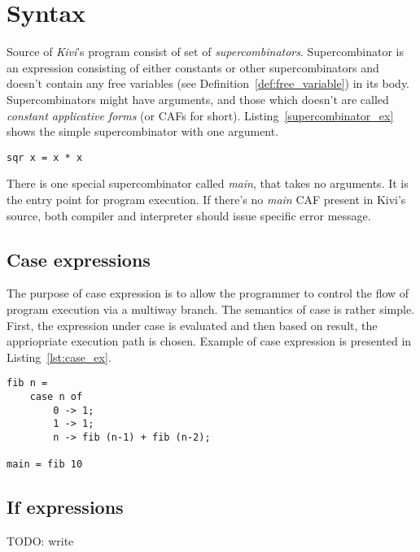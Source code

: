 \documentclass[12pt,a4paper]{report}
\begin{document}
\section{Syntax}
Source of \textit{Kivi}'s program consist of set of
\textit{supercombinators}\cite{wiki:supercombinator}. Supercombinator is an
expression consisting of either constants or other supercombinators and doesn't
contain any free variables (see Definition~\ref{def:free_variable}) in its
body. Supercombinators might have arguments, and those which doesn't are called
\textit{constant applicative forms} (or CAFs for short).
Listing~\ref{supercombinator_ex} shows the simple supercombinator with one
argument.

\hspace*{-1.5in}
\begin{lstlisting}[style=haskell,label=supercombinator_ex,caption={Simple supercombinator.}]
sqr x = x * x
\end{lstlisting}

There is one special supercombinator called \textit{main}, that takes no
arguments. It is the entry point for program execution. If there's no
\textit{main} CAF present in Kivi's source, both compiler and interpreter
should issue specific error message.

\subsection{Case expressions}
The purpose of case expression is to allow the programmer to control the flow
of program execution via a multiway branch. The semantics of case is rather
simple. First, the expression under case is evaluated and then based on result,
the appriopriate execution path is chosen. Example of case expression is
presented in Listing~\ref{lst:case_ex}.

\hspace*{-1.5in}
\begin{lstlisting}[style=haskell,label=lst:case_ex,caption={Fibonacci with case}]
fib n =
    case n of
        0 -> 1;
        1 -> 1;
        n -> fib (n-1) + fib (n-2);

main = fib 10
\end{lstlisting}

\subsection{If expressions}

TODO: write
\end{document}
